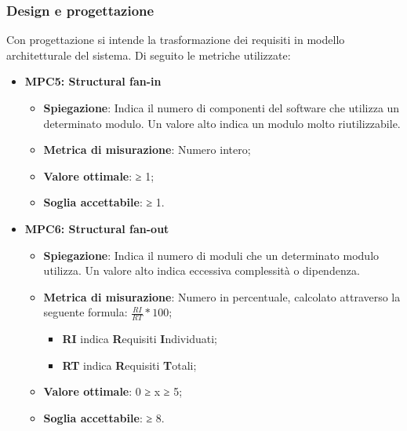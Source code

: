 \subsubsection{Design e progettazione}
Con progettazione si intende la trasformazione dei requisiti in modello architetturale del sistema. Di seguito le metriche utilizzate:
\begin{itemize}
    \item \textbf{MPC5: Structural fan-in}
    \begin{itemize}
        \item \textbf{Spiegazione}: Indica il numero di componenti del software che utilizza un determinato modulo. Un valore alto indica un modulo molto riutilizzabile.
        \item \textbf{Metrica di misurazione}: Numero intero;
        \item \textbf{Valore ottimale}: ≥ 1;
        \item \textbf{Soglia accettabile}: ≥ 1.
    \end{itemize}
    \item \textbf{MPC6: Structural fan-out}
    \begin{itemize}
        \item \textbf{Spiegazione}: Indica il numero di moduli che un determinato modulo utilizza. Un valore alto indica eccessiva complessità o dipendenza.
        \item \textbf{Metrica di misurazione}: Numero in percentuale, calcolato attraverso la seguente formula: \textbf{$\frac{RI}{RT} * 100$};
            \begin{itemize}
                \item \textbf{RI} indica \textbf{R}equisiti \textbf{I}ndividuati;
                \item \textbf{RT} indica \textbf{R}equisiti \textbf{T}otali;
            \end{itemize}
        \item \textbf{Valore ottimale}: 0 ≥ x ≥ 5; 
        \item \textbf{Soglia accettabile}: ≥ 8. %
    \end{itemize}
\end{itemize}

